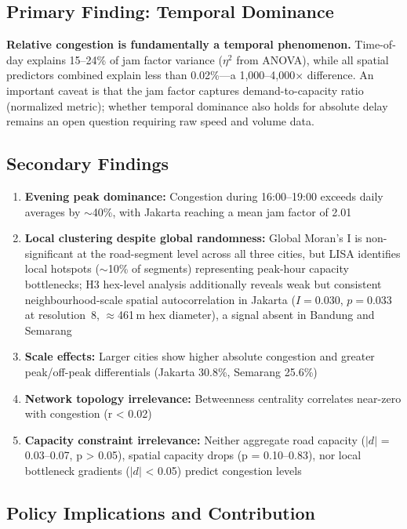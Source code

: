 \documentclass[12pt,a4paper]{article}
\begin{document}
\subsection{Primary Finding: Temporal Dominance}

\textbf{Relative congestion is fundamentally a temporal phenomenon.} Time-of-day explains 15--24\% of jam factor variance ($\eta^2$ from ANOVA), while all spatial predictors combined explain less than 0.02\%---a 1,000--4,000$\times$ difference. An important caveat is that the jam factor captures demand-to-capacity ratio (normalized metric); whether temporal dominance also holds for absolute delay remains an open question requiring raw speed and volume data.

\subsection{Secondary Findings}

\begin{enumerate}
\item \textbf{Evening peak dominance:} Congestion during 16:00--19:00 exceeds daily averages by $\sim$40\%, with Jakarta reaching a mean jam factor of 2.01
\item \textbf{Local clustering despite global randomness:} Global Moran's I is non-significant at the road-segment level across all three cities, but LISA identifies local hotspots ($\sim$10\% of segments) representing peak-hour capacity bottlenecks; H3 hex-level analysis additionally reveals weak but consistent neighbourhood-scale spatial autocorrelation in Jakarta ($I = 0.030$, $p = 0.033$ at resolution~8, $\approx$461\,m hex diameter), a signal absent in Bandung and Semarang
\item \textbf{Scale effects:} Larger cities show higher absolute congestion and greater peak/off-peak differentials (Jakarta 30.8\%, Semarang 25.6\%)
\item \textbf{Network topology irrelevance:} Betweenness centrality correlates near-zero with congestion (r < 0.02)
\item \textbf{Capacity constraint irrelevance:} Neither aggregate road capacity ($|d|$ = 0.03--0.07, p > 0.05), spatial capacity drops (p = 0.10--0.83), nor local bottleneck gradients ($|d|$ < 0.05) predict congestion levels
\end{enumerate}

\subsection{Policy Implications and Contribution}
\end{document}

